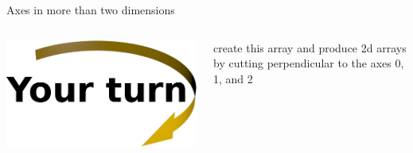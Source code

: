 \documentclass[svgnames]{beamer}
\begin{document}
\begin{frame}[fragile]{Axes in more than two dimensions}
 \vspace{0.5truecm}
 \begin{columns}
  \begin{column}{0.3\textwidth}
   \begin{center}
    \includegraphics[width=3truecm]{yourturn}
   \end{center}
  \end{column}%
  \begin{column}{0.6\textwidth}
   create this array and produce 2d arrays by cutting perpendicular to the axes 0, 1, and 2
  \end{column}
 \end{columns}
\end{frame}
\end{document}
